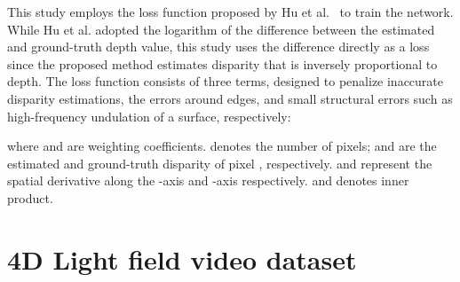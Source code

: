 \documentclass[]{spie}
\newcommand{\mycut}[1]{}
\newcommand{\jtextd}[1]{}
\begin{document}
This study employs the loss function proposed by Hu et al.~\cite{hu2019revisiting} 
to train the network. 
While Hu et al. adopted the logarithm of 
the difference between the estimated and ground-truth depth value,
this study uses the difference directly as a loss 
since the proposed method estimates disparity that is inversely proportional to depth.
The loss function  consists of three terms, 
designed to penalize inaccurate disparity estimations, the errors around edges,
and small structural errors such as high-frequency undulation of a surface,
respectively:

where  and  are weighting coefficients.
 denotes the number of pixels; 
 and  are the estimated and ground-truth 
disparity of pixel , respectively.
 and  represent 
the spatial derivative along the -axis and -axis respectively.
 and
 denotes inner product.

\mycut{
The loss function used in this study can be expressed as:

where  and  are weighting coefficients.
The above loss function  is composed of three terms. 
 is applied to penalize inaccurate 
disparity estimations and is expressed as:

where  is the number of pixels; 
 and  are the estimated and ground-truth 
disparity of pixel  respectively.
}

\mycut{
\jtextd{
  は，エッジ周辺の誤差にペナルティを与えるように設計されており，
  次のように定義される．
  
  ここで，およびは，それぞれ軸，軸に沿った
  空間微分を表す．
}
 is designed to penalize the errors around edges. 
It is defined as:

where  and  represent 
the spatial derivative along the -axis and -axis respectively.


\jtextd{
  最後の項目は，2つの表面法線間の角度を測定することで，
  表面の高周波うねりのような小さな誤差に対するペナルティを与えるように設計されており，
次のように定義される．
  
  ここで，であり，
  は内積を表す．
}
The last item  is designed to measure the angle
between two surface normals in order to penalize 
small structural errors such as those of high-frequency undulation
of a surface.
It is expressed as:

where  and
 denotes inner product.
}



\section{4D Light field video dataset}
\label{sec:dataset}
\end{document}
